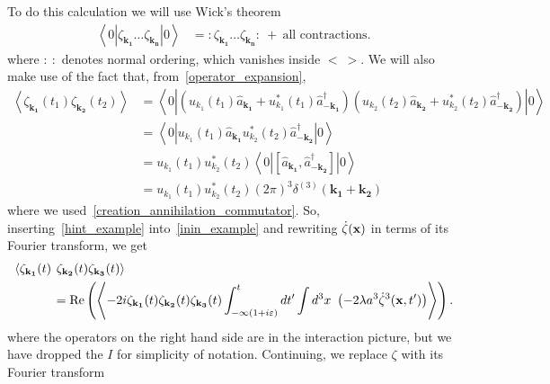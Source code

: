 To do this calculation we will use Wick's theorem
\begin{align}\label{wick}
    \left<0\left|\zeta_{\mathbf{k_1}}\ldots\zeta_{\mathbf{k_n}}\right|0\right>
    &= :\zeta_{\mathbf{k_1}}\ldots\zeta_{\mathbf{k_n}}:~+~\text{all contractions}.
\end{align}
where $:~:$ denotes normal ordering, which vanishes inside $<~>$.
We will also make use of the fact that, from~\eqref{operator_expansion},
\begin{align}
    \left<\zeta_{\mathbf{k_1}}(t_1)\zeta_{\mathbf{k_2}}(t_2)\right>
    &= \left<0\left|
            \left(u_{k_1}(t_1)\hat{a}_\mathbf{k_1} +
            u^*_{k_1}(t_1)\hat{a}^{\dagger}_{-\mathbf{k_1}}\right)
            \left(u_{k_2}(t_2)\hat{a}_\mathbf{k_2} +
            u^*_{k_2}(t_2)\hat{a}^{\dagger}_{-\mathbf{k_2}}\right)
        \right|0\right>\\
    &= \left<0\left|
            u_{k_1}(t_1)\hat{a}_\mathbf{k_1}
            u^*_{k_2}(t_2)\hat{a}^{\dagger}_{-\mathbf{k_2}}
        \right|0\right>\\
    &= u_{k_1}(t_1)u^*_{k_2}(t_2)\left<0\left|
            \left[\hat{a}_\mathbf{k_1},
            \hat{a}^{\dagger}_{-\mathbf{k_2}}\right]
        \right|0\right>\\
    &= u_{k_1}(t_1)u^*_{k_2}(t_2)(2\pi)^3\delta^{(3)}(\mathbf{k_1}+\mathbf{k_2})
\end{align}
where we used~\eqref{creation_annihilation_commutator}.
So, inserting~\eqref{hint_example} into~\eqref{inin_example}
and rewriting $\dot{\zeta}(\mathbf{x})$ in terms of its Fourier transform,
we get
\begin{align}\label{inin_example_start}
    \left<\zeta_{\mathbf{k_1}}(t)\right.&\left.\zeta_{\mathbf{k_2}}(t)\zeta_{\mathbf{k_3}}(t)\right>\\
    &=\operatorname{Re}\left(\left<-2i \zeta_{\mathbf{k_1}}(t)\zeta_{\mathbf{k_2}}(t)\zeta_{\mathbf{k_3}}(t)
    \int_{-\infty(1+i\varepsilon)}^{t}dt'
    \int d^3x~\left(-2\lambda a^3\dot{\zeta}^3(\mathbf{x},t')\right)
    \right>\right).
\end{align}
where the operators on the right hand side are in the interaction picture,
but we have dropped the $I$ for simplicity of notation.
Continuing, we replace $\zeta$ with its Fourier transform

